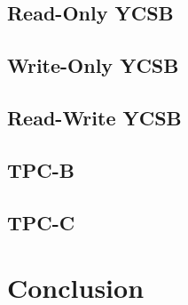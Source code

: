    

\subsection{Read-Only YCSB} \label{subsec:looking_glass_multi_threaded_read_only_ycsb}

    

\subsection{Write-Only YCSB} \label{subsec:looking_glass_multi_threaded_write_only_ycsb}

    

\subsection{Read-Write YCSB} \label{subsec:looking_glass_multi_threaded_read_write_ycsb}

    

\subsection{TPC-B} \label{subsec:looking_glass_multi_threaded_tpcb}

    

\subsection{TPC-C} \label{subsec:looking_glass_multi_threaded_tpcc}

    

\section{Conclusion} \label{sec:looking_glass_outro}

    
